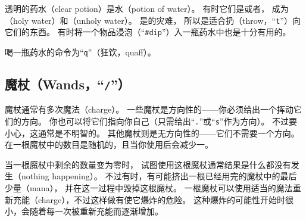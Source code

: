\documentclass[a4paper, 10pt]{article}
\begin{document}
透明的药水（clear potion）是水（potion of water）。
有时它们是\zhTransBlessed{}或者\zhTransCursed，
成为\zhTransHolyWater（holy water）和\zhTransUnholyWater（unholy water）。
\zhTransHolyWater{}是\zhTransUndead{}的灾难，
所以\zhTransHolyWater{}是适合扔（throw，“{\tt t}”）向它们的东西。
有时将一个物品浸泡（“{\tt \#dip}”）入一瓶药水中也是十分有用的。

喝一瓶药水的命令为“{\tt q}”（狂饮，quaff）。

\subsection*{魔杖（Wands，“{\tt /}”）}

魔杖通常有多次魔法\zhTransCharge（charge）。
一些魔杖是方向性的——你必须给出一个挥动它们的方向。
你也可以将它们指向你自己（只需给出“{\tt .}”或“{\tt s}”作为方向）。
不过要小心，这通常是不明智的。
其他魔杖则是无方向性的——它们不需要一个方向。
在一根魔杖中\zhTransCharge{}的数目是随机的，且当你使用后会减少一。

当一根魔杖中剩余的\zhTransCharge{}数量变为零时，
试图使用这根魔杖通常结果是什么都没有发生（nothing happening）。
不过有时，有可能挤出一根已经用完的魔杖中的最后少量\zhTransMana（mana），
并在这一过程中毁掉这根魔杖。
一根魔杖可以使用适当的魔法重新充能（charge），不过这样做有使它爆炸的危险。
这种爆炸的可能性开始时很小，会随着每一次被重新充能而逐渐增加。
\end{document}
